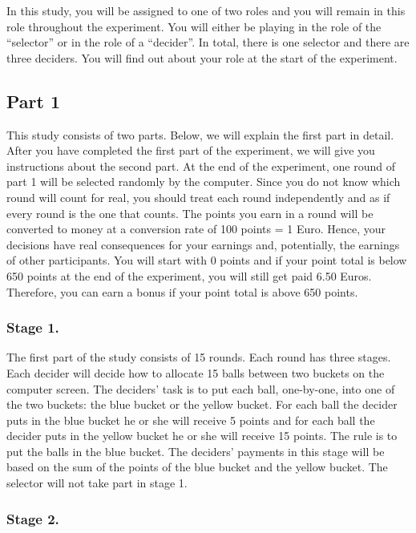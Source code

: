 \documentclass[man]{apa6}
\begin{document}
In this study, you will be assigned to one of two roles and you will
remain in this role throughout the experiment. You will either be
playing in the role of the ``selector'' or in the role of a ``decider''.
In total, there is one selector and there are three deciders. You will
find out about your role at the start of the experiment.

\hypertarget{part-1}{%
\subsection{Part 1}\label{part-1}}

This study consists of two parts. Below, we will explain the first part
in detail. After you have completed the first part of the experiment, we
will give you instructions about the second part. At the end of the
experiment, one round of part 1 will be selected randomly by the
computer. Since you do not know which round will count for real, you
should treat each round independently and as if every round is the one
that counts. The points you earn in a round will be converted to money
at a conversion rate of 100 points = 1 Euro. Hence, your decisions have
real consequences for your earnings and, potentially, the earnings of
other participants. You will start with 0 points and if your point total
is below 650 points at the end of the experiment, you will still get
paid 6.50 Euros. Therefore, you can earn a bonus if your point total is
above 650 points.

\hypertarget{stage-1.}{%
\subsubsection{Stage 1.}\label{stage-1.}}

The first part of the study consists of 15 rounds. Each round has three
stages. Each decider will decide how to allocate 15 balls between two
buckets on the computer screen. The deciders' task is to put each ball,
one-by-one, into one of the two buckets: the blue bucket or the yellow
bucket. For each ball the decider puts in the blue bucket he or she will
receive 5 points and for each ball the decider puts in the yellow bucket
he or she will receive 15 points. The rule is to put the balls in the
blue bucket. The deciders' payments in this stage will be based on the
sum of the points of the blue bucket and the yellow bucket. The selector
will not take part in stage 1.

\hypertarget{stage-2.}{%
\subsubsection{Stage 2.}\label{stage-2.}}
\end{document}
